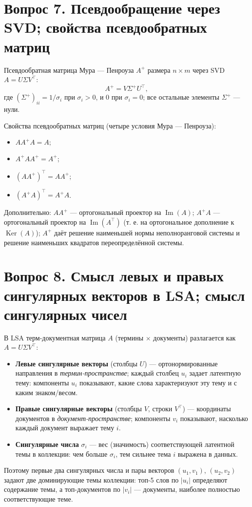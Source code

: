 \documentclass[12pt,a4paper]{article}
\begin{document}
\section{Вопрос 7. Псевдообращение через SVD; свойства псевдообратных матриц}
Псевдообратная матрица Мура — Пенроуза $A^+$ размера $n\times m$ через
SVD $A=U\Sigma V^\top$:
\[
    A^+ = V\Sigma^+U^\top,
\]
где $(\Sigma^+)_{ii}=1/\sigma_i$ при $\sigma_i>0$, и $0$ при $\sigma_i=0$;
все остальные элементы $\Sigma^+$ — нули.

Свойства псевдообратных матриц (четыре условия Мура — Пенроуза):
\begin{itemize}
    \item $AA^+A = A$;
    \item $A^+AA^+ = A^+$;
    \item $(AA^+)^\top = AA^+$;
    \item $(A^+A)^\top = A^+A$.
\end{itemize}
Дополнительно: $AA^+$ — ортогональный проектор на $\operatorname{Im}(A)$;
$A^+A$ — ортогональный проектор на $\operatorname{Im}(A^\top)$
(т. е. на ортогональное дополнение к $\operatorname{Ker}(A)$);
$A^+$ даёт решение наименьшей нормы неполноранговой системы и решение
наименьших квадратов переопределённой системы.

\section{Вопрос 8. Смысл левых и правых сингулярных векторов в LSA; смысл сингулярных чисел}
В LSA терм-документная матрица $A$ (термины $\times$ документы)
разлагается как $A=U\Sigma V^\top$:
\begin{itemize}
    \item \textbf{Левые сингулярные векторы} (столбцы $U$) — ортонормированные
    направления в \emph{термин-пространстве}; каждый столбец $u_i$ задает
    латентную тему: компоненты $u_i$ показывают, какие слова характеризуют
    эту тему и с каким знаком/весом.
    \item \textbf{Правые сингулярные векторы} (столбцы $V$, строки $V^\top$)
    — координаты документов в \emph{документ-пространстве}; компоненты $v_i$
    показывают, насколько каждый документ выражает тему $i$.
    \item \textbf{Сингулярные числа} $\sigma_i$ — вес (значимость)
    соответствующей латентной темы в коллекции: чем больше $\sigma_i$, тем
    сильнее тема $i$ выражена в данных.
\end{itemize}
Поэтому первые два сингулярных числа и пары векторов $(u_1,v_1)$,
$(u_2,v_2)$ задают две доминирующие темы коллекции: топ-5 слов по $|u_i|$
определяют содержание темы, а топ-документов по $|v_i|$ — документы, наиболее
полностью соответствующие теме.
\end{document}
